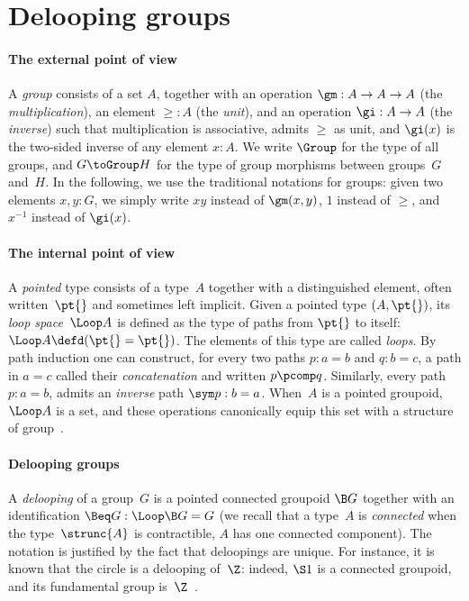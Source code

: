 \section{Delooping groups}
\label{delooping}

\paragraph{The external point of view}
A \emph{group} consists of a set $A$, together with an operation
$\gm:A\to A\to A$ (the \emph{multiplication}), an element $\ge:A$ (the
\emph{unit}), and an operation $\gi:A\to A$ (the \emph{inverse}) such that
multiplication is associative, admits $\ge$ as unit, and $\gi(x)$ is the
two-sided inverse of any element $x:A$. We write $\Group$ for the type of all
groups, and $G\toGroup H$ for the type of group morphisms between groups~$G$
and~$H$.
%
In the following, we use the traditional notations for groups: given two
elements $x,y:G$, we simply write $xy$ instead of $\gm(x,y)$, $1$ instead of
$\ge$, and $x^{-1}$ instead of $\gi(x)$.

\paragraph{The internal point of view}
\label{internal-groups} 
A \emph{pointed} type consists of a type~$A$ together with a distinguished
element, often written~$\pt{}$ and sometimes left implicit. Given a pointed type
$(A,\pt{})$, its \emph{loop space}~$\Loop A$ is defined as the type of paths
from $\pt{}$ to itself: $\Loop A\defd(\pt{}=\pt{})$. The elements of this type
are called \emph{loops}. By path induction one can construct, for every two
paths $p:a=b$ and $q:b=c$, a path in $a=c$ called their \emph{concatenation} and
written $p\pcomp q$. Similarly, every path~$p:a=b$, admits an \emph{inverse}
path $\sym p:b=a$. When~$A$ is a pointed groupoid, $\Loop A$ is a set, and these
operations canonically equip this set with a structure of
group~\cite[Section~2.1]{hottbook}.

\paragraph{Delooping groups}
A \emph{delooping} of a group~$G$ is a pointed connected groupoid $\B G$
together with an identification $\Beq G:\Loop\B G=G$ (we recall that a type~$A$
is \emph{connected} when the type~$\strunc{A}$ is contractible, \ie $A$ has one
connected component).
%
The notation is justified by the fact that deloopings are unique.
%
For instance, it is known that the circle is a delooping of~$\Z$: indeed, $\S1$ is a connected groupoid, and its fundamental group is~$\Z$~\cite[Section~8.1]{hottbook}.

